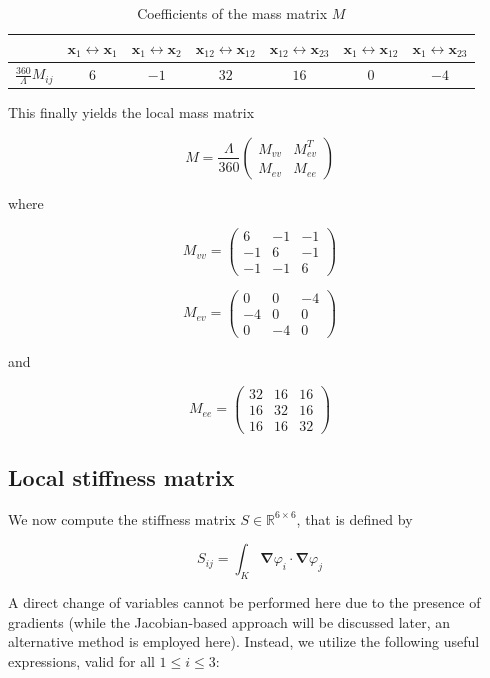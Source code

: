 \documentclass{article}
\theoremstyle{definition}
\theoremstyle{proposition}
\theoremstyle{theorem}
\theoremstyle{remark}
\theoremstyle{corollary}  %
\theoremstyle{exercise}
\theoremstyle{lemma}
\begin{document}
\begin{table}[h]
\centering
\begin{tabular}{|c|c|c|c|c|c|c|}
\hline
 & $\bm x_1 \leftrightarrow \bm x_1$ & $\bm x_1 \leftrightarrow \bm x_2$ & $\bm x_{12} \leftrightarrow \bm x_{12}$ & $\bm x_{12} \leftrightarrow \bm x_{23}$ & $\bm x_1 \leftrightarrow \bm x_{12}$ & $\bm x_1 \leftrightarrow \bm x_{23}$ \\
\hline
$\frac{360}{\Lambda}M_{ij}$
& $6$ & $-1$ & $32$ & $16$ & $0$ & $-4$ \\
\hline
\end{tabular}
\caption{Coefficients of the mass matrix $M$}
\end{table}

This finally yields the local mass matrix 

$$
M = \frac{\Lambda}{360}
\begin{pmatrix}
M_{vv} & M_{ev}^T \\
M_{ev} & M_{ee}
\end{pmatrix}
$$

where 

$$M_{vv} = \begin{pmatrix}
6 & -1 & -1 \\
-1 & 6 & -1 \\
-1 & -1 & 6 
\end{pmatrix}$$

$$M_{ev} =\begin{pmatrix}
0 & 0 & -4 \\
-4 & 0 & 0 \\
 0 & -4 & 0
\end{pmatrix}$$

and 

$$M_{ee} =\begin{pmatrix}
32 & 16 & 16 \\
16 & 32 & 16 \\
16 & 16 & 32 
\end{pmatrix}$$


\subsection{Local stiffness matrix}

We now compute the stiffness matrix $S\in \mathbb{R}^{6 \times 6}$, that is defined by 

$$S_{ij} = \int_{K}\bm \nabla \varphi_i \cdot \bm \nabla \varphi_j $$

A direct change of variables cannot be performed here due to the presence of gradients (while the Jacobian-based approach will be discussed later, an alternative method is employed here). Instead, we utilize the following useful expressions, valid for all $1\leq i \leq 3$:
\end{document}
